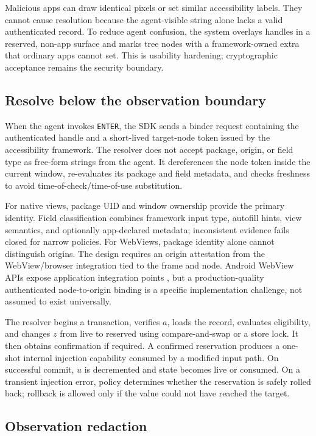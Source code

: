 Malicious apps can draw identical pixels or set similar accessibility labels. They cannot cause resolution because the agent-visible string alone lacks a valid authenticated record. To reduce agent confusion, the system overlays handles in a reserved, non-app surface and marks tree nodes with a framework-owned extra that ordinary apps cannot set. This is usability hardening; cryptographic acceptance remains the security boundary.

\subsection{Resolve below the observation boundary}

When the agent invokes \texttt{ENTER}, the SDK sends a binder request containing the authenticated handle and a short-lived target-node token issued by the accessibility framework. The resolver does not accept package, origin, or field type as free-form strings from the agent. It dereferences the node token inside the current window, re-evaluates its package and field metadata, and checks freshness to avoid time-of-check/time-of-use substitution.

For native views, package UID and window ownership provide the primary identity. Field classification combines framework input type, autofill hints, view semantics, and optionally app-declared metadata; inconsistent evidence fails closed for narrow policies. For WebViews, package identity alone cannot distinguish origins. The design requires an origin attestation from the WebView/browser integration tied to the frame and node. Android WebView APIs expose application integration points \cite{androidWebView}, but a production-quality authenticated node-to-origin binding is a specific implementation challenge, not assumed to exist universally.

The resolver begins a transaction, verifies $a$, loads the record, evaluates eligibility, and changes $z$ from live to reserved using compare-and-swap or a store lock. It then obtains confirmation if required. A confirmed reservation produces a one-shot internal injection capability consumed by a modified input path. On successful commit, $u$ is decremented and state becomes live or consumed. On a transient injection error, policy determines whether the reservation is safely rolled back; rollback is allowed only if the value could not have reached the target.

\subsection{Observation redaction}

